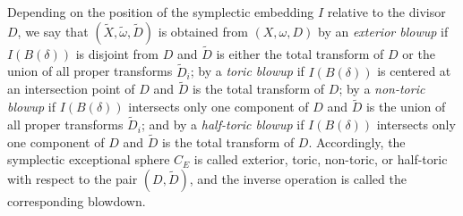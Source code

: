 \documentclass[11pt]{article}
\theoremstyle{definition}
\theoremstyle{remark}
\begin{document}
Depending on the position of the symplectic embedding $I$ relative to the divisor $D$, we say that $(\tilde{X},\tilde{\omega},\tilde{D})$ is obtained from $(X,\omega,D)$ by an \emph{exterior blowup} if $I(B(\delta))$ is disjoint from $D$ and $\tilde{D}$ is either the total transform of $D$ or the union of all proper transforms $\tilde{D}_i$; by a \emph{toric blowup} if $I(B(\delta))$ is centered at an intersection point of $D$ and $\tilde{D}$ is the total transform of $D$; by a \emph{non-toric blowup} if $I(B(\delta))$ intersects only one component of $D$ and $\tilde{D}$ is the union of all proper transforms $\tilde{D}_i$; and by a \emph{half-toric blowup} if $I(B(\delta))$ intersects only one component of $D$ and $\tilde{D}$ is the total transform of $D$.
Accordingly, the symplectic exceptional sphere $C_E$ is called exterior, toric, non-toric, or half-toric with respect to the pair $(D,\tilde{D})$, and the inverse operation is called the corresponding blowdown.
\end{document}
